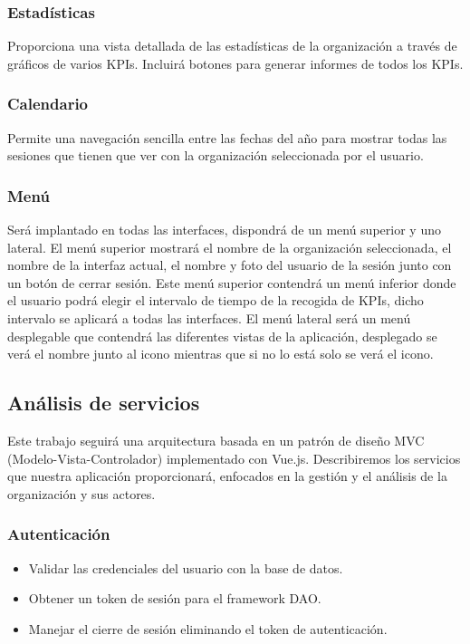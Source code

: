 \subsubsection{Estadísticas}
Proporciona una vista detallada de las estadísticas de la organización a través de gráficos de varios KPIs. Incluirá botones para generar informes de todos los KPIs.
\subsubsection{Calendario}
Permite una navegación sencilla entre las fechas del año para mostrar todas las sesiones que tienen que ver con la organización seleccionada por el usuario.
\subsubsection{Menú}
Será implantado en todas las interfaces, dispondrá de un menú superior y uno lateral.
El menú superior mostrará el nombre de la organización seleccionada, el nombre de la interfaz actual, el nombre y foto del usuario de la sesión junto con un botón de cerrar sesión.
Este menú superior contendrá un menú inferior donde el usuario podrá elegir el intervalo de tiempo de la recogida de KPIs, dicho intervalo se aplicará a todas las interfaces.
El menú lateral será un menú desplegable que contendrá las diferentes vistas de la aplicación, desplegado se verá el nombre junto al icono mientras que si no lo está solo se verá el icono.
\subsection{Análisis de servicios}
Este trabajo seguirá una arquitectura basada en un patrón de diseño MVC (Modelo-Vista-Controlador) implementado con Vue.js. Describiremos los servicios que nuestra aplicación proporcionará, enfocados en la gestión y el análisis de la organización y sus actores.

\subsubsection{Autenticación}
\begin{itemize}
    \item Validar las credenciales del usuario con la base de datos.
    \item Obtener un token de sesión para el framework DAO.
    \item Manejar el cierre de sesión eliminando el token de autenticación.
\end{itemize}
